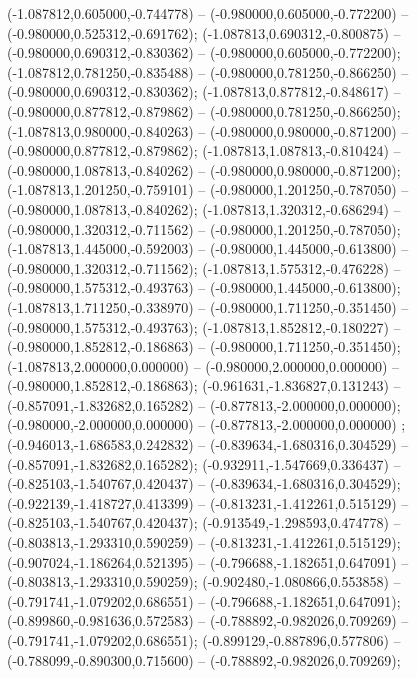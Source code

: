  (-1.087812,0.605000,-0.744778) -- (-0.980000,0.605000,-0.772200) -- (-0.980000,0.525312,-0.691762);
 (-1.087813,0.690312,-0.800875) -- (-0.980000,0.690312,-0.830362) -- (-0.980000,0.605000,-0.772200);
 (-1.087812,0.781250,-0.835488) -- (-0.980000,0.781250,-0.866250) -- (-0.980000,0.690312,-0.830362);
 (-1.087813,0.877812,-0.848617) -- (-0.980000,0.877812,-0.879862) -- (-0.980000,0.781250,-0.866250);
 (-1.087813,0.980000,-0.840263) -- (-0.980000,0.980000,-0.871200) -- (-0.980000,0.877812,-0.879862);
 (-1.087813,1.087813,-0.810424) -- (-0.980000,1.087813,-0.840262) -- (-0.980000,0.980000,-0.871200);
 (-1.087813,1.201250,-0.759101) -- (-0.980000,1.201250,-0.787050) -- (-0.980000,1.087813,-0.840262);
 (-1.087813,1.320312,-0.686294) -- (-0.980000,1.320312,-0.711562) -- (-0.980000,1.201250,-0.787050);
 (-1.087813,1.445000,-0.592003) -- (-0.980000,1.445000,-0.613800) -- (-0.980000,1.320312,-0.711562);
 (-1.087813,1.575312,-0.476228) -- (-0.980000,1.575312,-0.493763) -- (-0.980000,1.445000,-0.613800);
 (-1.087813,1.711250,-0.338970) -- (-0.980000,1.711250,-0.351450) -- (-0.980000,1.575312,-0.493763);
 (-1.087813,1.852812,-0.180227) -- (-0.980000,1.852812,-0.186863) -- (-0.980000,1.711250,-0.351450);
 (-1.087813,2.000000,0.000000) -- (-0.980000,2.000000,0.000000) -- (-0.980000,1.852812,-0.186863);
 (-0.961631,-1.836827,0.131243) -- (-0.857091,-1.832682,0.165282) -- (-0.877813,-2.000000,0.000000);
 (-0.980000,-2.000000,0.000000) -- (-0.877813,-2.000000,0.000000) ;
 (-0.946013,-1.686583,0.242832) -- (-0.839634,-1.680316,0.304529) -- (-0.857091,-1.832682,0.165282);
 (-0.932911,-1.547669,0.336437) -- (-0.825103,-1.540767,0.420437) -- (-0.839634,-1.680316,0.304529);
 (-0.922139,-1.418727,0.413399) -- (-0.813231,-1.412261,0.515129) -- (-0.825103,-1.540767,0.420437);
 (-0.913549,-1.298593,0.474778) -- (-0.803813,-1.293310,0.590259) -- (-0.813231,-1.412261,0.515129);
 (-0.907024,-1.186264,0.521395) -- (-0.796688,-1.182651,0.647091) -- (-0.803813,-1.293310,0.590259);
 (-0.902480,-1.080866,0.553858) -- (-0.791741,-1.079202,0.686551) -- (-0.796688,-1.182651,0.647091);
 (-0.899860,-0.981636,0.572583) -- (-0.788892,-0.982026,0.709269) -- (-0.791741,-1.079202,0.686551);
 (-0.899129,-0.887896,0.577806) -- (-0.788099,-0.890300,0.715600) -- (-0.788892,-0.982026,0.709269);
